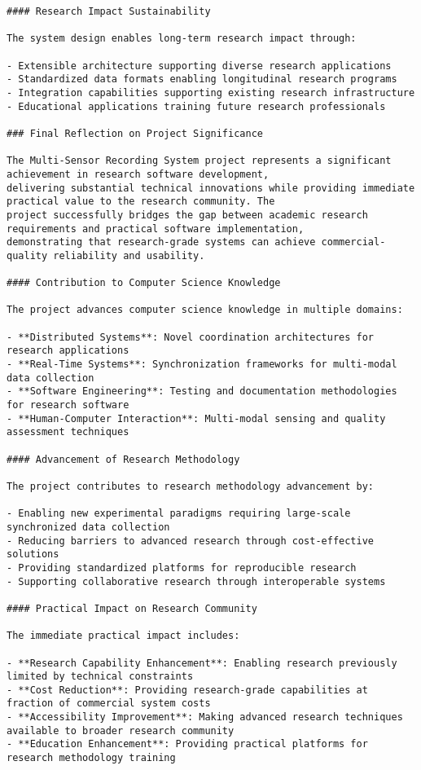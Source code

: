 \documentclass[11pt,a4paper]{report}
\begin{document}
\begin{verbatim}
#### Research Impact Sustainability

The system design enables long-term research impact through:

- Extensible architecture supporting diverse research applications
- Standardized data formats enabling longitudinal research programs
- Integration capabilities supporting existing research infrastructure
- Educational applications training future research professionals

### Final Reflection on Project Significance

The Multi-Sensor Recording System project represents a significant achievement in research software development,
delivering substantial technical innovations while providing immediate practical value to the research community. The
project successfully bridges the gap between academic research requirements and practical software implementation,
demonstrating that research-grade systems can achieve commercial-quality reliability and usability.

#### Contribution to Computer Science Knowledge

The project advances computer science knowledge in multiple domains:

- **Distributed Systems**: Novel coordination architectures for research applications
- **Real-Time Systems**: Synchronization frameworks for multi-modal data collection
- **Software Engineering**: Testing and documentation methodologies for research software
- **Human-Computer Interaction**: Multi-modal sensing and quality assessment techniques

#### Advancement of Research Methodology

The project contributes to research methodology advancement by:

- Enabling new experimental paradigms requiring large-scale synchronized data collection
- Reducing barriers to advanced research through cost-effective solutions
- Providing standardized platforms for reproducible research
- Supporting collaborative research through interoperable systems

#### Practical Impact on Research Community

The immediate practical impact includes:

- **Research Capability Enhancement**: Enabling research previously limited by technical constraints
- **Cost Reduction**: Providing research-grade capabilities at fraction of commercial system costs
- **Accessibility Improvement**: Making advanced research techniques available to broader research community
- **Education Enhancement**: Providing practical platforms for research methodology training


\end{verbatim}
\end{document}
